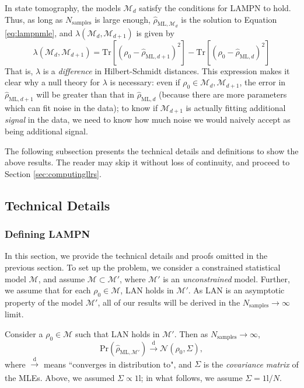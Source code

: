 \documentclass[aps,pra, twocolumn]{revtex4-1}
\newcommand{\M}{\mathcal{M}}
\newcommand{\Id}{\mathbb{I}}
\def\Id{1\!\mathrm{l}}
\newcommand{\rhohat}{\hat{\rho}}
\newcommand{\rhoML}[1]{\rhohat_{\scriptscriptstyle{\mathrm{ML},#1}}}
\begin{document}
In state tomography, the models $\M_{d}$ satisfy the conditions for LAMPN to hold. Thus, as long as $N_{\mathrm{samples}}$ is large enough, $\rhoML{\M_{d}}$ is the solution to Equation \eqref{eq:lampnmle}, and $\lambda(\M_{d},\M_{d+1})$ is given by
\begin{equation}
\lambda(\M_{d}, \M_{d+1}) = \mathrm{Tr}[(\rho_{0} - \rhoML{d+1})^{2}] -  \mathrm{Tr}[(\rho_{0} - \rhoML{d})^{2}]
\end{equation}
That is, $\lambda$ is a \emph{difference} in Hilbert-Schmidt distances. This expression makes it clear why a null theory for $\lambda$ is necessary: even if $\rho_{0} \in \M_{d},\M_{d+1}$, the error in $\rhoML{d+1}$ will be greater than that in $\rhoML{d}$ (because there are more parameters which can fit noise in the data); to know if $\M_{d+1}$ is actually fitting additional \emph{signal} in the data, we need to know how much noise we would naively accept as being additional signal.

The following subsection presents the technical details and definitions to show the above results. The reader may skip it without loss of continuity, and proceed to Section \ref{sec:computingllrs}.

\subsection{Technical Details}

\subsubsection{Defining LAMPN}

In this section, we provide the technical details and proofs omitted in the previous section. To set up the problem, we consider a constrained statistical model $\M$, and assume $\M \subset \M'$, where $\M'$ is an \emph{unconstrained} model. Further, we assume that for each $\rho_{0} \in \M$, LAN holds in $\M'$. As LAN is an asymptotic property of the model $\M'$, all of our results will be derived in the $N_{\mathrm{samples}} \rightarrow \infty$ limit.

Consider a $\rho_{0} \in \M$ such that LAN holds in $\M'$. Then as $N_{\mathrm{samples}} \rightarrow \infty$,
\[\mathrm{Pr}(\rhoML{\M'})\xrightarrow[]{\text{d}} \mathcal{N}\left(\rho_{0}, \Sigma\right),\]
where $\xrightarrow[]{\text{d}}$ means ``converges in distribution to", and $\Sigma$ is the \emph{covariance matrix} of the MLEs. Above, we assumed $\Sigma \propto \Id$; in what follows, we assume $\Sigma = \Id/N$.
\end{document}
